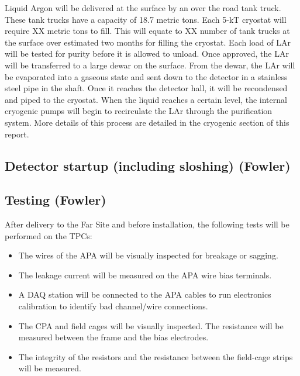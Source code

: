 Liquid Argon will be delivered at the surface by an over the road tank truck.  These tank trucks have a capacity of 18.7 metric tons.  Each 5-kT cryostat will require XX metric tons to fill.  This will equate to XX number of tank trucks at the surface over estimated two months for filling the cryostat.  Each load of LAr will be tested for purity before it is allowed to unload.  Once approved, the LAr will be transferred to a large dewar on the surface.  From the dewar, the LAr will be evaporated into a gaseous state and sent down to the detector in a stainless steel pipe in the shaft.  Once it reaches the detector hall, it will be recondensed and piped to the cryostat.  When the liquid reaches a certain level, the internal cryogenic pumps will begin to recirculate the LAr through the purification system.  More details of this process are detailed in the cryogenic section of this report.

\subsection{Detector startup (including sloshing) (Fowler)}
\label{fd:install:startup}


\subsection{Testing (Fowler)}
\label{fd:install:testing}

After delivery to the Far Site and before installation, the following tests will be performed on the TPCs: 
\begin{itemize}
\item The wires of the APA will be visually inspected for breakage or sagging. 
\item The leakage current will be measured on the APA wire bias terminals. 
\item A DAQ station will be connected to the APA cables to run electronics calibration to identify bad channel/wire connections. 
\item The CPA and field cages will be visually inspected. The resistance will be measured between the frame and the bias electrodes. 
\item The integrity of the resistors and the resistance between the field-cage strips will be measured. 
\end{itemize}

